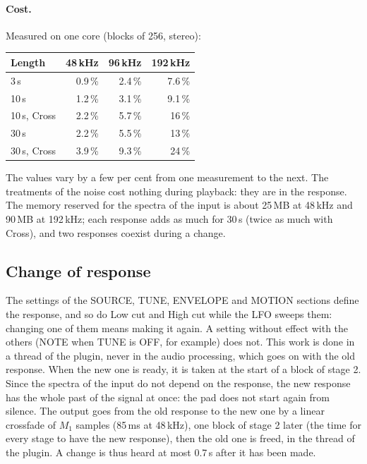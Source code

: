 \documentclass[a4paper,11pt]{article}
\begin{document}
\paragraph{Cost.} Measured on one core (blocks of 256, stereo):
\begin{center}
\small
\begin{tabular}{@{}l r r r@{}}
\toprule
Length & 48\,kHz & 96\,kHz & 192\,kHz \\
\midrule
3\,s  & 0.9\,\% & 2.4\,\% & 7.6\,\% \\
10\,s & 1.2\,\% & 3.1\,\% & 9.1\,\% \\
10\,s, Cross & 2.2\,\% & 5.7\,\% & 16\,\% \\
30\,s & 2.2\,\% & 5.5\,\% & 13\,\% \\
30\,s, Cross & 3.9\,\% & 9.3\,\% & 24\,\% \\
\bottomrule
\end{tabular}
\end{center}
The values vary by a few per cent from one measurement to the next. The treatments of the noise
cost nothing during playback: they are in the response. The memory reserved for the spectra of the
input is about 25\,MB at 48\,kHz and 90\,MB at 192\,kHz; each response adds as much for 30\,s (twice
as much with Cross), and two responses coexist during a change.

\subsection{Change of response}\label{sec:change}

The settings of the SOURCE, TUNE, ENVELOPE and MOTION sections define the response, and so do Low
cut and High cut while the LFO sweeps them: changing one of them means making it again. A
setting without effect with the others (NOTE when TUNE is OFF, for example) does not. This work is
done in a thread of the plugin, never in the audio processing, which goes on with the old response.
When the new one is ready, it is taken at the start of a block of stage 2. Since the spectra of the input
do not depend on the response, the new response has the whole past of the signal at once: the pad
does not start again from silence. The output goes from the old response to the new one by a linear
crossfade of $M_1$ samples (85\,ms at 48\,kHz), one block of stage 2 later (the time for every
stage to have the new response), then the old one is freed, in the thread of the plugin. A change
is thus heard at most 0.7\,s after it has been made.
\end{document}
